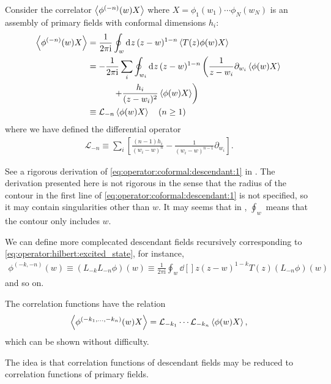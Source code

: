 \documentclass[10pt]{article}
\newcommand{\ii}{\mathrm{i}}
\begin{document}
Consider the correlator $\expval{\phi^{(-n)}(w)X}$ where $X=\phi_1(w_1)\cdots\phi_N(w_N)$ is an assembly of primary fields with conformal dimensions $h_i$:
\begin{align}
    \expval{\phi^{(-n)}(w)X} & =\frac{1}{2\pi\ii}\oint_w\dd[]{z}(z-w)^{1-n}\expval{T(z)\phi(w)X}\notag                                                  \\
                             & =-\frac{1}{2\pi\ii}\sum_i\oint_{w_i}\dd[]{z}(z-w)^{1-n}\left(\frac{1}{z-w_i}\partial_{w_i}\expval{\phi(w)X}\right.\notag \\
                             & \quad\quad\quad\left.+\frac{h_i}{(z-w_i)^2}\expval{\phi(w)X}\right)\notag                                                \\
                             & \equiv\mathcal{L}_{-n}\expval{\phi(w)X}\quad(n\geq1)\label{eq:operator:coformal:descendant:1}
\end{align}
where we have defined the differential operator 
\begin{align}
    \mathcal{L}_{-n}\equiv\sum_{i}\left[\frac{(n-1)h_i}{(w_i-w)^n}-\frac{1}{(w_i-w)^{n-1}}\partial_{w_i}\right].
\end{align}
\begin{notice}
    See a rigorous derivation of \cref{eq:operator:coformal:descendant:1} in \cite{Ribault:2014hia}.
    The derivation presented here is not rigorous in the sense that the radius of the contour in the first line of \cref{eq:operator:coformal:descendant:1} is not specified, so it may contain singularities other than $w$.
    It may seems that in \cite{DiFrancesco:1997nk}, $\oint_w$ means that the contour only includes $w$.
\end{notice}

We can define more complecated descendant fields recursively corresponding to \cref{eq:operator:hilbert:excited_state}, for instance,
\begin{align}
    \phi^{(-k,-n)}(w)\equiv(L_{-k}L_{-n}\phi)(w)\equiv\frac{1}{2\pi\ii}\oint_w\dd[]{z}(z-w)^{1-k}T(z)(L_{-n}\phi)(w)
\end{align}
and so on.
\begin{claim}
    The correlation functions have the relation 
    \begin{align}
        \expval{\phi^{(-k_1,\dots,-k_n)}(w)X}=\mathcal{L}_{-k_1}\cdots\mathcal{L}_{-k_n}\expval{\phi(w)X},
    \end{align}
    which can be shown without difficulty.
\end{claim}
\begin{remark}
    The idea is that correlation functions of descendant fields may be reduced to correlation functions of primary fields.
\end{remark}
\end{document}
